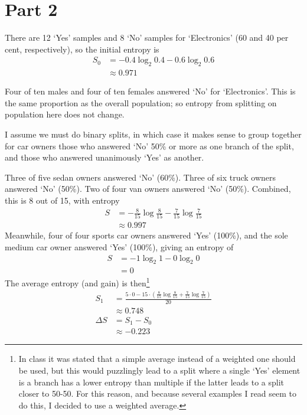 \documentclass{article}
\begin{document}
	\section{Part 2}
	\par 
	There are 12 `Yes' samples and 8 `No' samples for `Electronics' (60 and 40 per cent, respectively), so the initial entropy is 
	\begin{align*}
		S_0 &= -0.4\log_2 0.4 - 0.6\log_2 0.6\\
		&\approx 0.971
	\end{align*}
	\par
	Four of ten males and four of ten females answered `No' for `Electronics'. This is the same proportion as the overall population; so entropy from splitting on population here does not change.
	\par
	I assume we must do binary splits, in which case it makes sense to group together for car owners those who answered `No' 50\% or more as one branch of the split, and those who answered unanimously `Yes' as another.
	\par 
	Three of five sedan owners answered `No' (60\%). Three of six truck owners answered `No' (50\%). Two of four van owners answered `No' (50\%). Combined, this is 8 out of 15, with entropy
	\begin{align*}
		S &= -\frac{8}{15}\log\frac{8}{15} -\frac{7}{15}\log\frac{7}{15}\\
		&\approx 0.997
	\end{align*}
	Meanwhile, four of four sports car owners answered `Yes' (100\%), and the sole medium car owner answered `Yes' (100\%), giving an entropy of
	\begin{align*}
		S &= -1\log_2 1 - 0\log_2 0\\
		&= 0
	\end{align*}
	The average entropy (and gain) is then\footnote{In class it was stated that a simple average instead of a weighted one should be used, but this would puzzlingly lead to a split where a single `Yes' element is a branch has a lower entropy than multiple if the latter leads to a split closer to 50-50. For this reason, and because several examples I read seem to do this, I decided to use a weighted average.}
	\begin{align*}
		S_1 &= \frac{5\cdot 0 - 15\cdot\left(\frac{8}{15}\log\frac{8}{15} + \frac{7}{15}\log\frac{7}{15}\right)}{20}\\
		&\approx 0.748\\
		\Delta S &= S_1 - S_0\\
		&\approx -0.223
	\end{align*}
\end{document}
